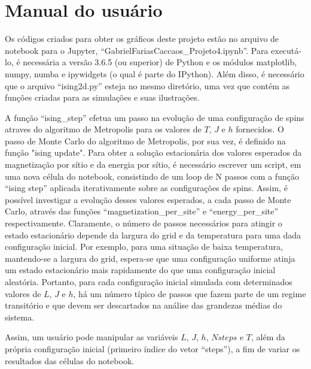 \section{Manual do usuário}

Os códigos criados para obter os gráficos deste projeto estão no arquivo de notebook para o Jupyter, ``GabrielFariasCaccaos{\_}Projeto4.ipynb''. Para executá-lo, é necessária a versão 3.6.5 (ou superior) de Python e os módulos matplotlib, numpy, numba e ipywidgets (o qual é parte do IPython). \cite{scipy} Além disso, é necessário que o arquivo ``ising2d.py'' esteja no mesmo diretório, uma vez que contém as funções criadas para as simulações e suas ilustrações.

A função ``ising{\_}step'' efetua um passo na evolução de uma configuração de spins atraves do algoritmo de Metropolis para os valores de $T$, $J$ e $h$ fornecidos. O passo de Monte Carlo do algoritmo de Metropolis, por sua vez, é definido na função "ising update". Para obter a solução estacionária dos valores esperados da magnetização por sítio e da energia por sítio, é necessário escrever um script, em uma nova célula do notebook, consistindo de um loop de N passos com a função ``ising step'' aplicada iterativamente sobre as configurações de spins. Assim, é possível investigar a evolução desses valores esperados, a cada passo de Monte Carlo, através das funções ``magnetization{\_}per{\_}site'' e ``energy{\_}per{\_}site'' respectivamente. Claramente, o número de passos necessários para atingir o estado estacionário depende da largura do grid e da temperatura para uma dada configuração inicial. Por exemplo, para uma situação de baixa temperatura, mantendo-se a largura do grid, espera-se que uma configuração uniforme atinja um estado estacionário mais rapidamente do que uma configuração inicial aleatória. Portanto, para cada configuração inicial simulada com determinados valores de $L$, $J$ e $h$, há um número típico de passos que fazem parte de um regime transitório e que devem ser descartados na análise das grandezas médias do sistema.

Assim, um usuário pode manipular as variáveis $L$, $J$, $h$, $Nsteps$ e $T$, além da própria configuração inicial (primeiro índice do vetor ``steps''), a fim de variar os resultados das células do notebook.